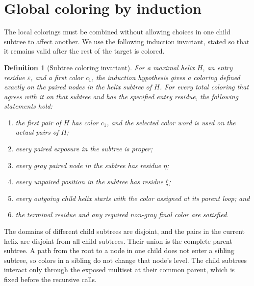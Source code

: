 \documentclass[11pt]{article}
\newtheorem{definition}[theorem]{Definition}
\begin{document}
\section{Global coloring by induction}
\label{sec:globalcolor}

The local colorings must be combined without allowing choices in one child subtree to affect another.  We use the following induction invariant, stated so that it remains valid after the rest of the target is colored.

\begin{definition}[Subtree coloring invariant]
For a maximal helix $H$, an entry residue $\varepsilon$, and a first color $c_1$, the induction hypothesis gives a coloring defined exactly on the paired nodes in the helix subtree of $H$.  For every total coloring that agrees with it on that subtree and has the specified entry residue, the following statements hold:
\begin{enumerate}
\item the first pair of $H$ has color $c_1$, and the selected color word is used on the actual pairs of $H$;
\item every paired exposure in the subtree is proper;
\item every gray paired node in the subtree has residue $\eta$;
\item every unpaired position in the subtree has residue $\xi$;
\item every outgoing child helix starts with the color assigned at its parent loop; and
\item the terminal residue and any required non-gray final color are satisfied.
\end{enumerate}
\end{definition}

The domains of different child subtrees are disjoint, and the pairs in the current helix are disjoint from all child subtrees.  Their union is the complete parent subtree.  A path from the root to a node in one child does not enter a sibling subtree, so colors in a sibling do not change that node's level.  The child subtrees interact only through the exposed multiset at their common parent, which is fixed before the recursive calls.
\end{document}
